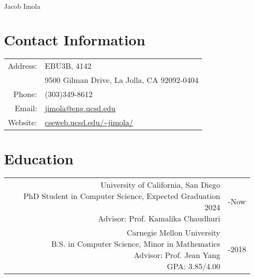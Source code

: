 \documentclass[11pt]{article}
\newcommand{\datewidth}{0.2\textwidth}
\newcommand{\descwidth}{0.755\textwidth}
\begin{document}


\centerline{{\Huge Jacob Imola}}

\section*{Contact Information}
\begin{tabular}{rl}
  Address: & EBU3B, 4142 \\
           & 9500 Gilman Drive, La Jolla, CA 92092-0404 \\
  Phone: & (303)349-8612 \\
  Email: & \href{mailto:jimola@eng.ucsd.edu}{jimola@eng.ucsd.edu} \\
  Website: & \url{cseweb.ucsd.edu/~jimola/}
\end{tabular}

\section*{Education}
\begin{tabular}{rl}
\parbox[t][][t]{\descwidth}{
  University of California, San Diego \\
  PhD Student in Computer Science, Expected Graduation 2024 \\
  Advisor: Prof. Kamalika Chaudhuri \\
} &
\parbox[t][][t]{\datewidth}{
  -Now
} \\
\parbox[t][][t]{\descwidth}{
  Carnegie Mellon University \\
  B.S. in Computer Science, Minor in Mathematics \\
  Advisor: Prof. Jean Yang \\
  GPA: 3.85/4.00
} &
\parbox[t][][t]{\datewidth}{
  -2018
}
\end{tabular}
\end{document}
